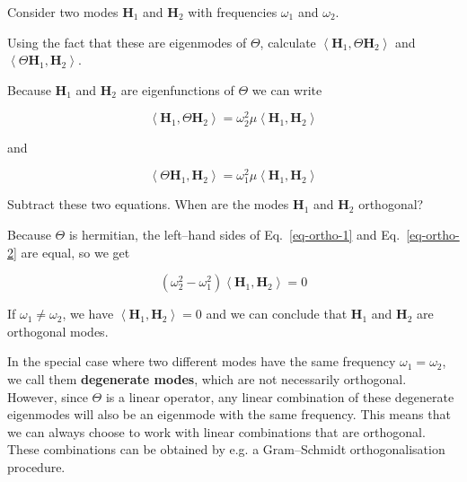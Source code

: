 Consider two modes ${\mathbf H}_1$ and ${\mathbf H}_2$ with frequencies $\omega_1$ and $\omega_2$.

\begin{cue}
Using the fact that these are eigenmodes of $\Theta$, calculate $\left\langle {\mathbf H}_1 , \Theta {\mathbf H}_2\right\rangle$ and $\left\langle \Theta {\mathbf H}_1 , {\mathbf H}_2\right\rangle$. 
\end{cue}
  
Because ${\mathbf H}_1$ and ${\mathbf H}_2$ are eigenfunctions of $\Theta$ we can write

\begin{equation}
 \left\langle {\mathbf H}_1 , \Theta {\mathbf H}_2\right\rangle = \omega_2^2 \mu \left\langle {\mathbf H}_1 , {\mathbf H}_2\right\rangle 
\label{eq-ortho-1}
\end{equation}

and

\begin{equation}
 \left\langle \Theta {\mathbf H}_1 , {\mathbf H}_2\right\rangle = \omega_1^2 \mu \left\langle {\mathbf H}_1 , {\mathbf H}_2\right\rangle
\label{eq-ortho-2}
\end{equation}

\begin{cue}
Subtract these two equations. When are the modes ${\mathbf H}_1$ and ${\mathbf H}_2$ orthogonal? 
\end{cue}

Because $\Theta$ is hermitian, the left--hand sides of Eq.~\ref{eq-ortho-1} and Eq.~\ref{eq-ortho-2} are equal, so we get

\begin{equation}
(\omega_2^2 - \omega_1^2) \left\langle {\mathbf H}_1 , {\mathbf H}_2\right\rangle = 0
\end{equation} 

If $\omega_1 \ne \omega_2$, we have $\left\langle {\mathbf H}_1 , {\mathbf H}_2\right\rangle = 0$ and we can conclude that ${\mathbf H}_1$ and ${\mathbf H}_2$ are orthogonal modes.

\noindent{}In the special case where two different modes have the same frequency $\omega_1 = \omega_2$, we call them \textbf{degenerate modes}, which are not necessarily orthogonal. However, since $\Theta$ is a linear operator, any linear combination of these degenerate eigenmodes will also be an eigenmode with the same frequency. This means that we can always choose to work with linear combinations that are orthogonal. These combinations can be obtained by e.g. a Gram--Schmidt orthogonalisation procedure.

